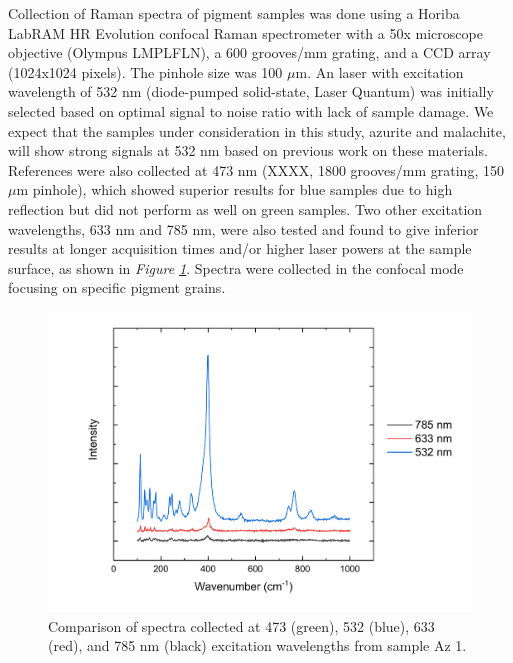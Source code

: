 Collection of Raman spectra of pigment samples was done using a Horiba LabRAM HR Evolution confocal Raman spectrometer with a 50x microscope objective (Olympus LMPLFLN), a 600 grooves/mm grating, and a CCD array (1024x1024 pixels). The pinhole size was 100 $\mu$m. An laser with excitation wavelength of 532 nm (diode-pumped solid-state, Laser Quantum) was initially selected based on optimal signal to noise ratio with lack of sample damage. We expect that the samples under consideration in this study, azurite and malachite, will show strong signals at 532 nm based on previous work on these materials.~\autocite{Bicchieri} References were also collected at 473 nm (XXXX, 1800 grooves/mm grating, 150 $\mu$m pinhole), which showed superior results for blue samples due to high reflection but did not perform as well on green samples. Two other excitation wavelengths, 633 nm and 785 nm, were also tested and found to give inferior results at longer acquisition times and/or higher laser powers at the sample surface, as shown in \textit{Figure \ref{fig:Az1_wavelength_comparison}}. Spectra were collected in the confocal mode focusing on specific pigment grains.

\begin{figure}[H]
\centering
  \includegraphics[width=0.75\linewidth]{Az1_wavelength_comparison}
\caption[Comparison of spectra collected at 473, 532, 633, and 785 nm excitation wavelengths from sample Az 1.]{Comparison of spectra collected at 473 (green), 532 (blue), 633 (red), and 785 nm (black) excitation wavelengths from sample Az 1.}
\label{fig:Az1_wavelength_comparison}
\end{figure}

